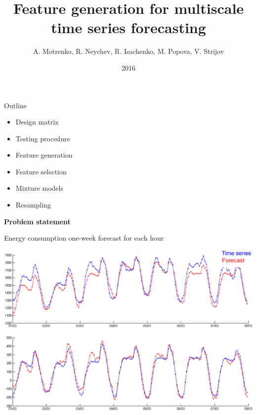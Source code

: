 \documentclass{beamer}
\title[\hbox to 56mm{Multiscale forecasting\hfill\insertframenumber\,/\,\inserttotalframenumber}]{Feature generation for multiscale time series forecasting}
\author[V. Strijov]{A. Motrenko, R. Neychev, R. Isachenko, M. Popova, V. Strijov}
\institute{Moscow Institute of Physics and Technology}
\date{2016}
\begin{document}
\begin{frame}
\maketitle
\end{frame}
\begin{frame}{Outline}


\begin{itemize}
\item Design matrix
\item Testing procedure
\item Feature generation
\item Feature selection
\item Mixture models
\item Resampling
\end{itemize}

\end{frame}
\begin{frame}
\vfill
\begin{center}
{\Large \bf Problem statement}
\end{center}
\vfill
\end{frame}
\begin{frame}{Energy consumption one-week forecast for each hour}%

\includegraphics[width=\textwidth]{fig/fig9.eps}
\end{frame}
\end{document}
